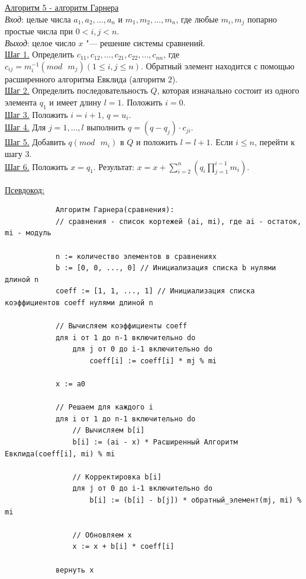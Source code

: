 \documentclass[bachelor, och, labwork]{shiza}
\begin{document}
        \underline{Алгоритм 5 - алгоритм Гарнера}\\
            \textit{Вход}: целые числа $a_1, a_2, \dots, a_n$ и $m_1, m_2,
            \dots, m_n$, где любые $m_i, m_j$ попарно простые числа при $0 < i,
            j < n$.\\
            \textit{Выход}: целое число $x$ "--- решение системы сравнений.\\
            \underline{Шаг 1.} Определить $c_{11}, c_{12}, \dots, c_{21},
            c_{22}, \dots, c_{nn}$, где $c_{ij} = m^{-1}_i (mod \text{ } m_j) (1
            \leq i, j \leq n)$. Обратный элемент находится с помощью
            расширенного алгоритма Евклида (алгоритм $2$).\\
            \underline{Шаг 2.} Определить последовательность $Q$, которая
            изначально состоит из одного элемента $q_1$ и имеет длину $l = 1$.
            Положить $i = 0$. \\
            \underline{Шаг 3.} Положить $i = i + 1$, $q = u_i$.\\
            \underline{Шаг 4.} Для $j = 1, \dots, l$ выполнить $q = (q -
            q_j) \cdot c_{ji}$.\\
            \underline{Шаг 5.} Добавить $q (mod \text{ } m_i)$ в $Q$ и положить
            $l = l + 1$. Если $i \leq n$, перейти к шагу 3.\\
            \underline{Шаг 6.} Положить $x = q_1$. Результат: $x = x + \sum_{i =
            2}^{n} (q_i \prod_{j = 1}^{i - 1} m_i)$.

            \underline{Псевдокод:}
            \begin{verbatim}
            Алгоритм Гарнера(сравнения):
            // сравнения - список кортежей (ai, mi), где ai - остаток, mi - модуль
        
            n := количество элементов в сравнениях
            b := [0, 0, ..., 0] // Инициализация списка b нулями длиной n
            coeff := [1, 1, ..., 1] // Инициализация списка коэффициентов coeff нулями длиной n
        
            // Вычисляем коэффициенты coeff
            для i от 1 до n-1 включительно do
                для j от 0 до i-1 включительно do
                    coeff[i] := coeff[i] * mj % mi
        
            x := a0
        
            // Решаем для каждого i
            для i от 1 до n-1 включительно do
                // Вычисляем b[i]
                b[i] := (ai - x) * Расширенный Алгоритм Евклида(coeff[i], mi) % mi
        
                // Корректировка b[i]
                для j от 0 до i-1 включительно do
                    b[i] := (b[i] - b[j]) * обратный_элемент(mj, mi) % mi
        
                // Обновляем x
                x := x + b[i] * coeff[i]
        
            вернуть x            
            \end{verbatim}
\end{document}

